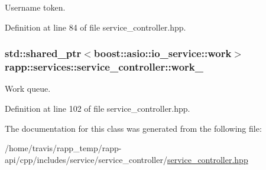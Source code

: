 Username token. 



Definition at line 84 of file service\-\_\-controller.\-hpp.

\hypertarget{classrapp_1_1services_1_1service__controller_ad328559c88362e93794640dc56b1739e}{
\subsubsection[{work\-\_\-}]{\setlength{\rightskip}{0pt plus 5cm}std\-::shared\-\_\-ptr$<$boost\-::asio\-::io\-\_\-service\-::work$>$ rapp\-::services\-::service\-\_\-controller\-::work\-\_\-\hspace{0.3cm}{\ttfamily [private]}}}\label{classrapp_1_1services_1_1service__controller_ad328559c88362e93794640dc56b1739e}


Work queue. 



Definition at line 102 of file service\-\_\-controller.\-hpp.



The documentation for this class was generated from the following file\-:\begin{DoxyCompactItemize}
\item 
/home/travis/rapp\-\_\-temp/rapp-\/api/cpp/includes/service/service\-\_\-controller/\hyperlink{service__controller_8hpp}{service\-\_\-controller.\-hpp}\end{DoxyCompactItemize}
